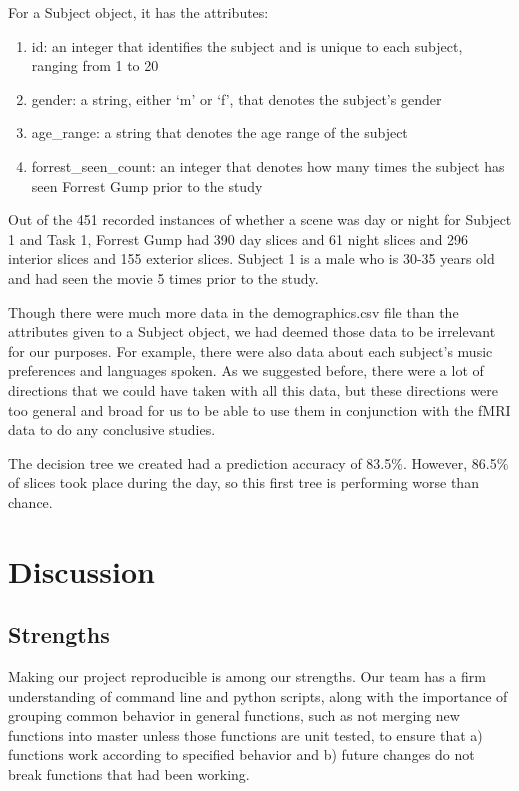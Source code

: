 \documentclass[11pt]{article}
\begin{document}
For a Subject object, it has the attributes:

\begin{enumerate}
\item id: an integer that identifies the subject and is unique to each
subject, ranging from 1 to 20
\item gender: a string, either ‘m’ or ‘f’, that denotes the subject’s gender
\item age\_range: a string that denotes the age range of the subject
\item forrest\_seen\_count: an integer that denotes how many times the subject
has seen Forrest Gump prior to the study
\end{enumerate}

Out of the 451 recorded instances of whether a scene was day or night for
Subject 1 and Task 1, Forrest Gump had 390 day slices and 61 night slices and
296 interior slices and 155 exterior slices. Subject 1 is a male who is 30-35
years old and had seen the movie 5 times prior to the study.

Though there were much more data in the demographics.csv file than the
attributes given to a Subject object, we had deemed those data to be
irrelevant for our purposes. For example, there were also data about each
subject’s music preferences and languages spoken. As we suggested before,
there were a lot of directions that we could have taken with all this data,
but these directions were too general and broad for us to be able to use them
in conjunction with the fMRI data to do any conclusive studies.

The decision tree we created had a prediction accuracy of 83.5\%.  However,
86.5\% of slices took place during the day, so this first tree is performing
worse than chance.

\section{Discussion}

\subsection{Strengths}

Making our project reproducible is
among our strengths. Our team has a firm understanding of command line and
python scripts, along with the importance of grouping common behavior in
general functions, such as not merging new functions into master unless those
functions are unit tested, to ensure that a) functions work according to
specified behavior and b) future changes do not break functions that had been
working.
\end{document}

